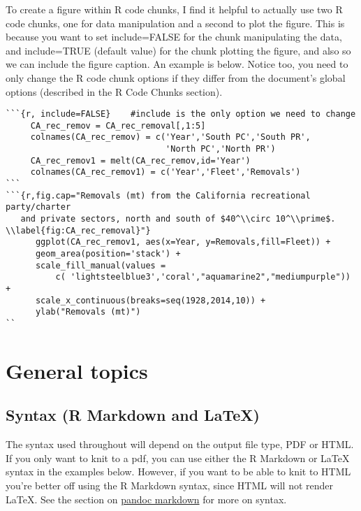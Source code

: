 \documentclass[12pt,]{article}
\begin{document}
To create a figure within R code chunks, I find it helpful to actually
use two R code chunks, one for data manipulation and a second to plot
the figure. This is because you want to set include=FALSE for the chunk
manipulating the data, and include=TRUE (default value) for the chunk
plotting the figure, and also so we can include the figure caption. An
example is below. Notice too, you need to only change the R code chunk
options if they differ from the document's global options (described in
the R Code Chunks section).

\begin{Verbatim}[frame=single]
```{r, include=FALSE}    #include is the only option we need to change
     CA_rec_remov = CA_rec_removal[,1:5]
     colnames(CA_rec_remov) = c('Year','South PC','South PR',
                                'North PC','North PR')
     CA_rec_remov1 = melt(CA_rec_remov,id='Year')
     colnames(CA_rec_remov1) = c('Year','Fleet','Removals')
```
```{r,fig.cap="Removals (mt) from the California recreational party/charter 
   and private sectors, north and south of $40^\\circ 10^\\prime$. 
\\label{fig:CA_rec_removal}"}
      ggplot(CA_rec_remov1, aes(x=Year, y=Removals,fill=Fleet)) +
      geom_area(position='stack') + 
      scale_fill_manual(values = 
          c( 'lightsteelblue3','coral',"aquamarine2","mediumpurple")) + 
      scale_x_continuous(breaks=seq(1928,2014,10)) + 
      ylab("Removals (mt)")
``
\end{Verbatim}

\section{General topics}\label{general-topics}

\subsection{Syntax (R Markdown and
LaTeX)}\label{syntax-r-markdown-and-latex}

The syntax used throughout will depend on the output file type, PDF or
HTML. If you only want to knit to a pdf, you can use either the R
Markdown or LaTeX syntax in the examples below. However, if you want to
be able to knit to HTML you're better off using the R Markdown syntax,
since HTML will not render LaTeX. See the section on
\href{http://rmarkdown.rstudio.com/authoring_pandoc_markdown.html}{pandoc
markdown} for more on syntax.
\end{document}
